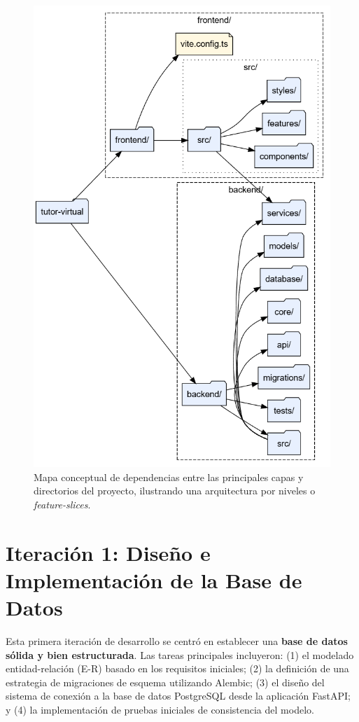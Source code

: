 \begin{figure}[H]
  \centering
  \includegraphics[width=0.8\linewidth]{Ilustraciones/folder_layers.png}
  \caption{Mapa conceptual de dependencias entre las principales capas y directorios del proyecto, ilustrando una arquitectura por niveles o \emph{feature-slices}.}
  \label{fig:desarrollo_folder-layers}
\end{figure}

\section{Iteración 1: Diseño e Implementación de la Base de Datos}
\label{sec:desarrollo_iter1_db}

Esta primera iteración de desarrollo se centró en establecer una \textbf{base de datos sólida y bien estructurada}. Las tareas principales incluyeron: (1) el modelado entidad-relación (E-R) basado en los requisitos iniciales; (2) la definición de una estrategia de migraciones de esquema utilizando Alembic; (3) el diseño del sistema de conexión a la base de datos PostgreSQL desde la aplicación FastAPI; y (4) la implementación de pruebas iniciales de consistencia del modelo.

